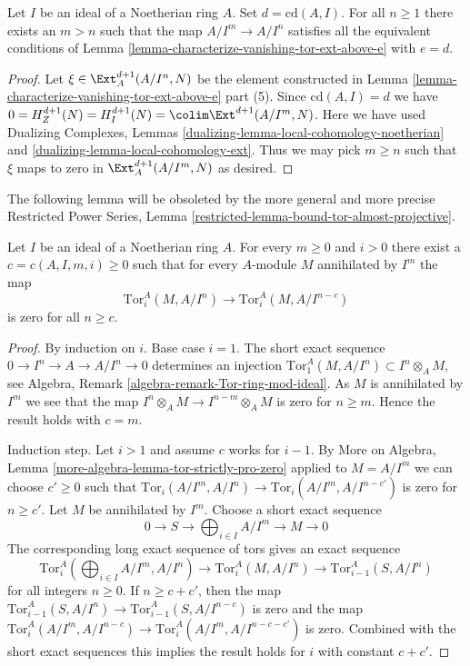 \begin{lemma}
\label{lemma-cd-sequence-Koszul}
Let $I$ be an ideal of a Noetherian ring $A$. Set $d = \text{cd}(A, I)$.
For all $n \geq 1$ there exists an $m > n$ such that the map
$A/I^m \to A/I^n$ satisfies all the equivalent conditions of
Lemma \ref{lemma-characterize-vanishing-tor-ext-above-e} with $e = d$.
\end{lemma}

\begin{proof}
Let $\xi \in \Ext^{d + 1}_A(A/I^n, N)$ be the element constructed in
Lemma \ref{lemma-characterize-vanishing-tor-ext-above-e} part (5).
Since $\text{cd}(A, I) = d$ we have
$0 = H^{d + 1}_Z(N) = H^{d + 1}_I(N) = \colim \Ext^{d + 1}(A/I^m, N)$.
Here we have used Dualizing Complexes, Lemmas
\ref{dualizing-lemma-local-cohomology-noetherian} and
\ref{dualizing-lemma-local-cohomology-ext}.
Thus we may pick $m \geq n$ such that $\xi$ maps to
zero in $\Ext^{d + 1}_A(A/I^m, N)$ as desired.
\end{proof}

\noindent
The following lemma will be obsoleted by the more general
and more precise Restricted Power Series, Lemma
\ref{restricted-lemma-bound-tor-almost-projective}.

\begin{lemma}
\label{lemma-maps-zero-fixed-torsion}
Let $I$ be an ideal of a Noetherian ring $A$. For every $m \geq 0$
and $i > 0$ there exist a $c = c(A, I, m, i) \geq 0$ such that
for every $A$-module $M$ annihilated by $I^m$ the map
$$
\text{Tor}^A_i(M, A/I^n) \to \text{Tor}^A_i(M, A/I^{n - c})
$$
is zero for all $n \geq c$.
\end{lemma}

\begin{proof}
By induction on $i$. Base case $i = 1$. The short exact sequence
$0 \to I^n \to A \to A/I^n \to 0$ determines an injection
$\text{Tor}_1^A(M, A/I^n) \subset I^n \otimes_A M$, see
Algebra, Remark \ref{algebra-remark-Tor-ring-mod-ideal}.
As $M$ is annihilated by $I^m$ we see that the map
$I^n \otimes_A M \to I^{n - m} \otimes_A M$ is
zero for $n \geq m$. Hence the result holds with $c = m$.

\medskip\noindent
Induction step. Let $i > 1$ and assume $c$ works for $i - 1$.
By More on Algebra, Lemma \ref{more-algebra-lemma-tor-strictly-pro-zero}
applied to $M = A/I^m$ we can choose $c' \geq 0$ such that
$\text{Tor}_i(A/I^m, A/I^n) \to \text{Tor}_i(A/I^m, A/I^{n - c'})$
is zero for $n \geq c'$. Let $M$ be annihilated by $I^m$. Choose a short
exact sequence
$$
0 \to S \to \bigoplus\nolimits_{i \in I} A/I^m \to M \to 0
$$
The corresponding long exact sequence of tors gives an exact sequence
$$
\text{Tor}_i^A(\bigoplus\nolimits_{i \in I} A/I^m, A/I^n) \to
\text{Tor}_i^A(M, A/I^n) \to
\text{Tor}_{i - 1}^A(S, A/I^n)
$$
for all integers $n \geq 0$. If $n \geq c + c'$, then the map
$\text{Tor}_{i - 1}^A(S, A/I^n) \to \text{Tor}_{i - 1}^A(S, A/I^{n - c})$
is zero and the map $\text{Tor}_i^A(A/I^m, A/I^{n - c}) \to 
\text{Tor}_i^A(A/I^m, A/I^{n - c - c'})$ is zero. Combined with the
short exact sequences this implies the result holds for $i$ with
constant $c + c'$.
\end{proof}

